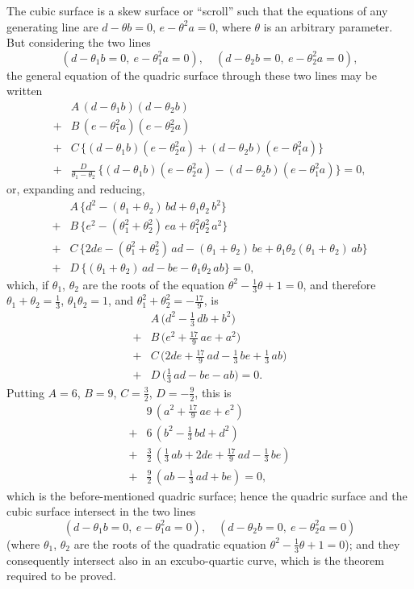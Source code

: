 \documentclass[11pt,a4paper]{article}
\theoremstyle{plain}
\begin{document}
The cubic surface is a skew surface or ``scroll'' such that the equations of any generating line are $d - \theta b = 0$, $e - \theta^2 a = 0$, where $\theta$ is an arbitrary parameter. But considering the two lines
\[
(d - \theta_1 b = 0,\ e - \theta_1^2 a = 0),\quad (d - \theta_2 b = 0,\ e - \theta_2^2 a = 0),
\]
the general equation of the quadric surface through these two lines may be written
\begin{align*}
&A\,(d - \theta_1 b)(d - \theta_2 b)\\
{}+{}&B\,(e - \theta_1^2 a)(e - \theta_2^2 a)\\
{}+{}&C\,\bigl\{(d - \theta_1 b)(e - \theta_2^2 a) + (d - \theta_2 b)(e - \theta_1^2 a)\bigr\}\\
{}+{}&\frac{D}{\theta_1 - \theta_2}\,\bigl\{(d - \theta_1 b)(e - \theta_2^2 a) - (d - \theta_2 b)(e - \theta_1^2 a)\bigr\} = 0,
\end{align*}
or, expanding and reducing,
\begin{align*}
&A\,\bigl\{d^2 - (\theta_1 + \theta_2)\,bd + \theta_1\theta_2\,b^2\bigr\}\\
{}+{}&B\,\bigl\{e^2 - (\theta_1^2 + \theta_2^2)\,ea + \theta_1^2\theta_2^2\,a^2\bigr\}\\
{}+{}&C\,\bigl\{2de - (\theta_1^2 + \theta_2^2)\,ad - (\theta_1 + \theta_2)\,be + \theta_1\theta_2(\theta_1 + \theta_2)\,ab\bigr\}\\
{}+{}&D\,\bigl\{(\theta_1 + \theta_2)\,ad - be - \theta_1\theta_2\,ab\bigr\} = 0,
\end{align*}
which, if $\theta_1$, $\theta_2$ are the roots of the equation $\theta^2 - \tfrac{1}{3}\theta + 1 = 0$, and therefore $\theta_1 + \theta_2 = \tfrac{1}{3}$, $\theta_1\theta_2 = 1$, and $\theta_1^2 + \theta_2^2 = -\tfrac{17}{9}$, is
\begin{align*}
&A\,\bigl(d^2 - \tfrac{1}{3}\,db + b^2\bigr)\\
{}+{}&B\,\bigl(e^2 + \tfrac{17}{9}\,ae + a^2\bigr)\\
{}+{}&C\,\bigl(2de + \tfrac{17}{9}\,ad - \tfrac{1}{3}\,be + \tfrac{1}{3}\,ab\bigr)\\
{}+{}&D\,\bigl(\tfrac{1}{3}\,ad - be - ab\bigr) = 0.
\end{align*}
Putting $A = 6$, $B = 9$, $C = \tfrac{3}{2}$, $D = -\tfrac{9}{2}$, this is
\begin{align*}
&9\,(a^2 + \tfrac{17}{9}\,ae + e^2)\\
{}+{}&6\,(b^2 - \tfrac{1}{3}\,bd + d^2)\\
{}+{}&\tfrac{3}{2}\,(\tfrac{1}{3}\,ab + 2de + \tfrac{17}{9}\,ad - \tfrac{1}{3}\,be)\\
{}+{}&\tfrac{9}{2}\,(ab - \tfrac{1}{3}\,ad + be) = 0,
\end{align*}
which is the before-mentioned quadric surface; hence the quadric surface and the cubic surface intersect in the two lines
\[
(d - \theta_1 b = 0,\ e - \theta_1^2 a = 0),\quad (d - \theta_2 b = 0,\ e - \theta_2^2 a = 0)
\]
(where $\theta_1$, $\theta_2$ are the roots of the quadratic equation $\theta^2 - \tfrac{1}{3}\theta + 1 = 0$); and they consequently intersect also in an excubo-quartic curve, which is the theorem required to be proved.
\end{document}
